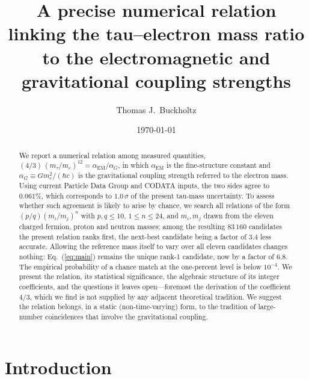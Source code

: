 \documentclass[aps,prd,preprint,amsmath,amssymb,nofootinbib]{revtex4-2}
\begin{document}
\title{A precise numerical relation linking the tau--electron mass ratio
to the electromagnetic and gravitational coupling strengths}

\author{Thomas J.\ Buckholtz}

\date{\today}

\begin{abstract}
We report a numerical relation among measured quantities,
$(4/3)\,(m_\tau/m_e)^{12} = \alpha_{\mathrm{EM}}/\alpha_G$,
in which $\alpha_{\mathrm{EM}}$ is the fine-structure constant and
$\alpha_G \equiv G m_e^2/(\hbar c)$ is the gravitational coupling strength
referred to the electron mass. Using current Particle Data Group and CODATA
inputs, the two sides agree to $0.061\%$, which corresponds to
$1.0\,\sigma$ of the present tau-mass uncertainty. To assess whether such
agreement is likely to arise by chance, we search all relations of the form
$(p/q)(m_i/m_j)^n$ with $p,q\le 10$, $1\le n\le 24$, and $m_i,m_j$ drawn from
the eleven charged fermion, proton and neutron masses; among the resulting
$83\,160$ candidates the present relation ranks first, the next-best candidate
being a factor of $3.4$ less accurate. Allowing the reference mass itself to
vary over all eleven candidates changes nothing: Eq.~(\ref{eq:main}) remains
the unique rank-1 candidate, now by a factor of $6.8$. The empirical
probability of a chance match at the one-percent level is below $10^{-4}$. We
present the relation, its statistical significance, the algebraic structure of
its integer coefficients, and the questions it leaves open---foremost the
derivation of the coefficient $4/3$, which we find is not supplied by any
adjacent theoretical tradition. We suggest the relation belongs, in a static
(non-time-varying) form, to the tradition of large-number coincidences that
involve the gravitational coupling.
\end{abstract}

\maketitle

\section{Introduction}
\end{document}
